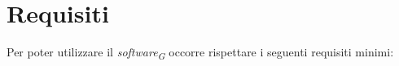 \section{Requisiti}
Per poter utilizzare il \textit{software}\textsubscript{\textit{G}} occorre rispettare i seguenti
requisiti minimi:  



